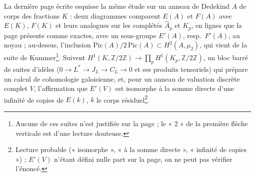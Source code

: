 \documentclass[11pt,a4paper]{article}
\begin{document}
La dernière page écrite esquisse la même étude sur un anneau de Dedekind $A$ de
corps des fractions $K$ : deux diagrammes comparent $E(A)$ et $F(A)$ avec $E(K)$,
$F(K)$ et leurs analogues sur les complétés $\hat A_p$ et $K_p$, en lignes que la
page présente comme exactes, avec un sous-groupe $E'(A)$, resp.\ $F'(A)$, au
noyau ; au-dessus, l'inclusion $\mathrm{Pic}(A)/2\,\mathrm{Pic}(A) \subset H^2(A,
\mu_2)$, qui vient de la suite de Kummer\footnote{Aucune de ces suites n'est
justifiée sur la page ; le « 2 » de la première flèche verticale est d'une
lecture douteuse.}. Suivent $H^1(K, \mathbb{Z}/2\mathbb{Z}) \to \prod_p H^1(K_p,
\mathbb{Z}/2\mathbb{Z})$, un bloc barré de suites d'idèles ($0 \to L^{*} \to J_L \to
C_L \to 0$ et ses produits tensoriels) qui prépare un calcul de cohomologie
galoisienne, et, pour un anneau de valuation discrète complet $V$, l'affirmation
que $E'(V)$ est isomorphe à la somme directe d'une infinité de copies de
$E(k)$, $k$ le corps résiduel\footnote{Lecture probable (« isomorphe », « à la
somme directe », « infinité de copies ») ; $E'(V)$ n'étant défini nulle part sur
la page, on ne peut pas vérifier l'énoncé.}.
\end{document}

